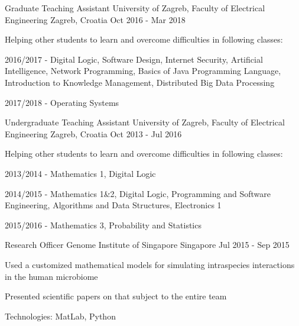 \begin{cventries}
  \cventry
    {Graduate Teaching Assistant} %
    {University of Zagreb, Faculty of Electrical Engineering} %
    {Zagreb, Croatia} %
    {Oct 2016 - Mar 2018} %
    {
      \begin{cvitems} %
        \item {Helping other students to learn and overcome difficulties in following classes:}
        \item {2016/2017 - Digital Logic, Software Design, Internet Security, Artificial Intelligence, Network Programming, Basics of Java Programming Language, Introduction to Knowledge Management, Distributed Big Data Processing}
        \item {2017/2018 - Operating Systems}
      \end{cvitems}
    }

  \cventry
    {Undergraduate Teaching Assistant} %
    {University of Zagreb, Faculty of Electrical Engineering} %
    {Zagreb, Croatia} %
    {Oct 2013 - Jul 2016} %
    {
      \begin{cvitems} %
        \item {Helping other students to learn and overcome difficulties in following classes:}
        \item {2013/2014 - Mathematics 1, Digital Logic}
        \item {2014/2015 - Mathematics 1\&2, Digital Logic, Programming and Software Engineering, Algorithms and Data Structures, Electronics 1}
        \item {2015/2016 - Mathematics 3, Probability and Statistics}
      \end{cvitems}
    }

  \cventry
    {Research Officer} %
    {Genome Institute of Singapore} %
    {Singapore} %
    {Jul 2015 - Sep 2015} %
    {
      \begin{cvitems} %
        \item {Used a customized mathematical models for simulating intraspecies interactions in the human microbiome}
        \item {Presented scientific papers on that subject to the entire team}
        \item {Technologies: MatLab, Python}
      \end{cvitems}
    }

\end{cventries}
